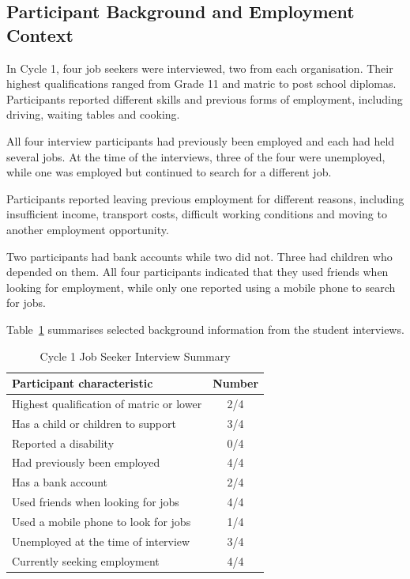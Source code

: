 \subsection{Participant Background and Employment Context}

In Cycle 1, four job seekers were interviewed, two from each organisation. Their highest qualifications ranged from Grade 11 and matric to post school diplomas. Participants reported different skills and previous forms of employment, including driving, waiting tables and cooking.

All four interview participants had previously been employed and each had held several jobs. At the time of the interviews, three of the four were unemployed, while one was employed but continued to search for a different job.

Participants reported leaving previous employment for different reasons, including insufficient income, transport costs, difficult working conditions and moving to another employment opportunity.

Two participants had bank accounts while two did not. Three had children who depended on them. All four participants indicated that they used friends when looking for employment, while only one reported using a mobile phone to search for jobs.

Table~\ref{tab:cycle1_interview_summary} summarises selected background information from the student interviews.

\begin{table}[htbp]
\centering
\caption{Cycle 1 Job Seeker Interview Summary}
\label{tab:cycle1_interview_summary}
\renewcommand{\arraystretch}{1.2}
\begin{tabular}{p{10cm}c}
\hline
\textbf{Participant characteristic} & \textbf{Number} \\
\hline
Highest qualification of matric or lower & 2/4 \\
Has a child or children to support & 3/4 \\
Reported a disability & 0/4 \\
Had previously been employed & 4/4 \\
Has a bank account & 2/4 \\
Used friends when looking for jobs & 4/4 \\
Used a mobile phone to look for jobs & 1/4 \\
Unemployed at the time of interview & 3/4 \\
Currently seeking employment & 4/4 \\
\hline
\end{tabular}
\end{table}

